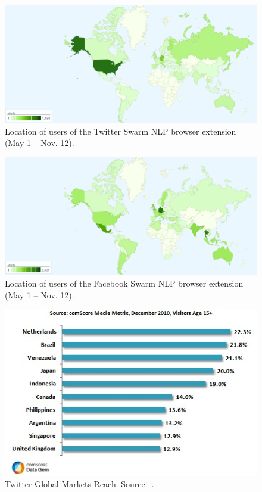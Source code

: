 \documentclass{iosart2c}
\begin{document}
\begin{figure}
\centering
\includegraphics[width=1.0\linewidth]{./resources/twitterlocation.png}
\caption{Location of users of the Twitter Swarm NLP browser extension (May 1 -- Nov. 12).}
\label{fig:twitterlocation}
\end{figure}

\begin{figure}
\centering
\includegraphics[width=1.0\linewidth]{./resources/facebooklocation.png}
\caption{Location of users of the Facebook Swarm NLP browser extension (May 1 -- Nov. 12).}
\label{fig:facebooklocation}
\end{figure}

\begin{figure}
\centering
\includegraphics[width=1.0\linewidth]{./resources/twitterglobalmarkets.jpg}
\caption{Twitter Global Markets Reach. Source:~\cite{comScoreTwitter}.}
\label{fig:twitterglobalmarkets}
\end{figure}
\end{document}
